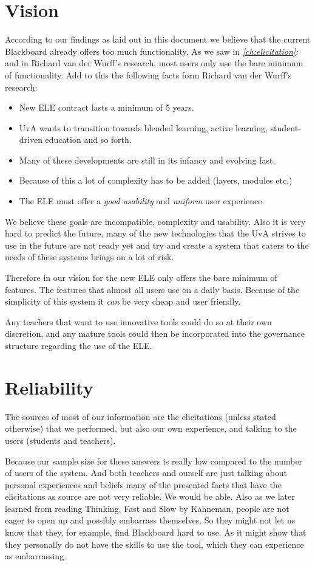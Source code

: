 \clearpage
\section{Vision}
According to our findings as laid out in this document we believe that the current Blackboard already offers too much functionality. As we saw in \emph{\ref{ch:elicitation}: } and in Richard van der Wurff's research, most users only use the bare minimum of functionality. Add to this the following facts form Richard van der Wurff's research:
\begin{itemize}
	\item New ELE contract lasts a minimum of 5 years.
	\item UvA wants to transition towards blended learning, active learning, student-driven education and so forth.
	\item Many of these developments are still in its infancy and evolving fast.
	\item Because of this a lot of complexity has to be added (layers, modules etc.)
	\item The ELE must offer a \emph{good usability} and \emph{uniform} user experience.
\end{itemize}

We believe these goals are incompatible, complexity and usability. Also it is very hard to predict the future, many of the new technologies that the UvA strives to use in the future are not ready yet and try and create a system that caters to the needs of these systems brings on a lot of risk.

Therefore in our vision for the new ELE only offers the bare minimum of features. The features that almost all users use on a daily basis. Because of the simplicity of this system it \emph{can} be very cheap and user friendly.

Any teachers that want to use innovative tools could do so at their own discretion, and any mature tools could then be incorporated into the governance structure regarding the use of the ELE.

\clearpage
\section{Reliability}
The sources of most of our information are the elicitations (unless stated otherwise) that we performed, but also our own experience, and talking to the users (students and teachers).

Because our sample size for these answers is really low compared to the number of users of the system. And both teachers and ourself are just talking about personal experiences and beliefs many of the presented facts that have the elicitations as source are not very reliable. We would be able.
Also as we later learned from reading Thinking, Fast and Slow by Kahneman, people are not eager to open up and possibly embarrass themselves. So they might not let us know that they, for example, find Blackboard hard to use. As it might show that they personally do not have the skills to use the tool, which they can experience as embarrassing.

